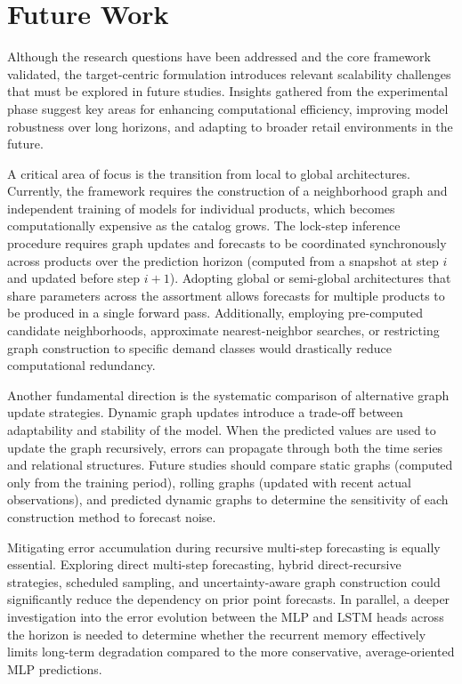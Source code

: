\section{Future Work}

Although the research questions have been addressed and the core framework validated, the target-centric formulation introduces relevant scalability challenges that must be explored in future studies. Insights gathered from the experimental phase suggest key areas for enhancing computational efficiency, improving model robustness over long horizons, and adapting to broader retail environments in the future.

A critical area of focus is the transition from local to global architectures. Currently, the framework requires the construction of a neighborhood graph and independent training of models for individual products, which becomes computationally expensive as the catalog grows. The lock-step inference procedure requires graph updates and forecasts to be coordinated synchronously across products over the prediction horizon (computed from a snapshot at step $i$ and updated before step $i+1$). Adopting global or semi-global architectures that share parameters across the assortment allows forecasts for multiple products to be produced in a single forward pass. Additionally, employing pre-computed candidate neighborhoods, approximate nearest-neighbor searches, or restricting graph construction to specific demand classes would drastically reduce computational redundancy.

Another fundamental direction is the systematic comparison of alternative graph update strategies. Dynamic graph updates introduce a trade-off between adaptability and stability of the model. When the predicted values are used to update the graph recursively, errors can propagate through both the time series and relational structures. Future studies should compare static graphs (computed only from the training period), rolling graphs (updated with recent actual observations), and predicted dynamic graphs to determine the sensitivity of each construction method to forecast noise.

Mitigating error accumulation during recursive multi-step forecasting is equally essential. Exploring direct multi-step forecasting, hybrid direct-recursive strategies, scheduled sampling, and uncertainty-aware graph construction could significantly reduce the dependency on prior point forecasts. In parallel, a deeper investigation into the error evolution between the MLP and LSTM heads across the horizon is needed to determine whether the recurrent memory effectively limits long-term degradation compared to the more conservative, average-oriented MLP predictions.

